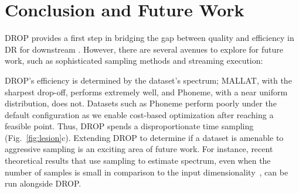 \section{Conclusion and Future Work}
\label{subsec:disc}

DROP provides a first step in bridging the gap between quality and efficiency in DR for downstream .
However, there are several avenues to explore for future work, such as sophisticated sampling methods and streaming execution:


DROP's efficiency is determined by the dataset's spectrum; MALLAT, with the sharpest drop-off, performs extremely well, and Phoneme, with a near uniform distribution, does not.
Datasets such as Phoneme perform poorly under the default configuration as we enable cost-based optimization after reaching a feasible point.
Thus, DROP spends a disproportionate time sampling (Fig.~\ref{fig:lesion}c). 
Extending DROP to determine if a dataset is amenable to aggressive sampling is an exciting area of future work. 
For instance, recent theoretical results that use sampling to estimate spectrum, even when the number of samples is small in comparison to the input dimensionality~\cite{estspec}, can be run alongside DROP.

